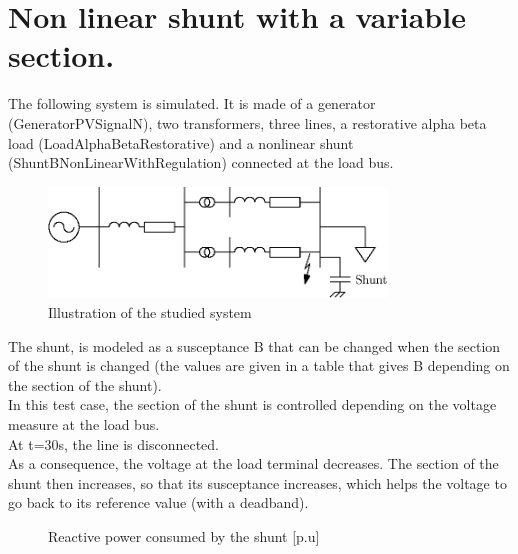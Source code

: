 \documentclass[a4paper, 12pt]{report}
\begin{document}
\chapter{Non linear shunt with a variable section.}

The following system is simulated. It is made of a generator (GeneratorPVSignalN), two transformers, three lines, a restorative alpha beta load (LoadAlphaBetaRestorative) and a nonlinear shunt (ShuntBNonLinearWithRegulation) connected at the load bus.\\

\begin{figure}[H]
  \begin{center}
  \includegraphics[width=0.8\textwidth]{ShuntWithRegulation}
  \end{center}
  \caption{Illustration of the studied system}
\end{figure}

The shunt, is modeled as a susceptance B that can be changed when the section of the shunt is changed (the values are given in a table that gives B depending on the section of the shunt).\\

In this test case, the section of the shunt is controlled depending on the voltage measure at the load bus.\\

At t=30s, the line is disconnected.\\

As a consequence, the voltage at the load terminal decreases. The section of the shunt then increases, so that its susceptance increases, which helps the voltage to go back to its reference value (with a deadband).

\begin{figure}[H]
  \caption{Reactive power consumed by the shunt [p.u]}
\end{figure}
\end{document}
